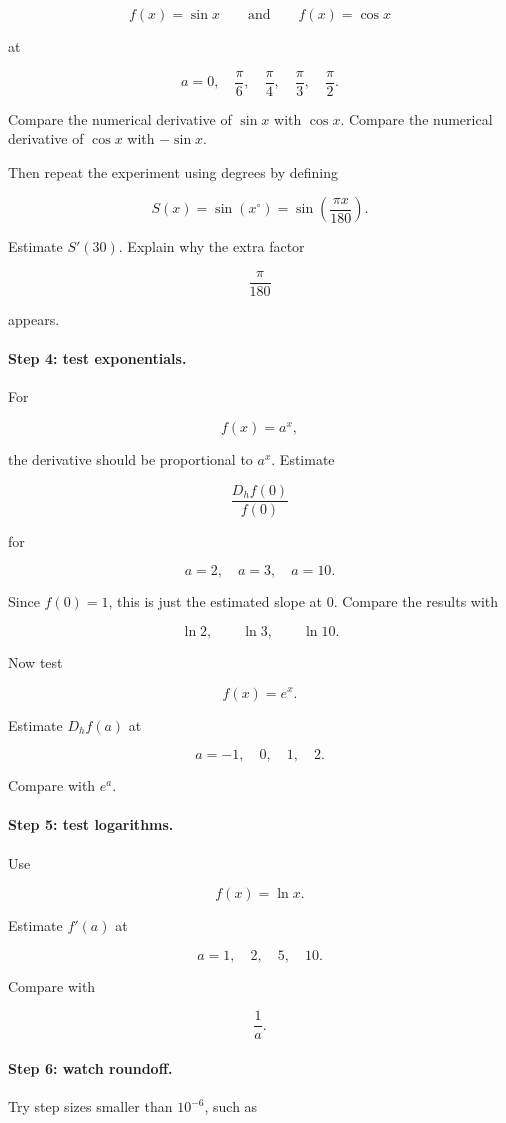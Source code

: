 \[
f(x)=\sin x
\qquad\text{and}\qquad
f(x)=\cos x
\]

at

\[
a=0,\quad \frac{\pi}{6},\quad \frac{\pi}{4},\quad \frac{\pi}{3},\quad \frac{\pi}{2}.
\]

Compare the numerical derivative of \(\sin x\) with \(\cos x\).  Compare the numerical derivative of \(\cos x\) with \(-\sin x\).

Then repeat the experiment using degrees by defining

\[
S(x)=\sin(x^\circ)=\sin\left(\frac{\pi x}{180}\right).
\]

Estimate \(S'(30)\).  Explain why the extra factor

\[
\frac{\pi}{180}
\]

appears.

\paragraph{Step 4: test exponentials.}
For

\[
f(x)=a^x,
\]

the derivative should be proportional to \(a^x\).  Estimate

\[
\frac{D_h f(0)}{f(0)}
\]

for

\[
a=2,\quad a=3,\quad a=10.
\]

Since \(f(0)=1\), this is just the estimated slope at \(0\).  Compare the results with

\[
\ln2,\qquad \ln3,\qquad \ln10.
\]

Now test

\[
f(x)=e^x.
\]

Estimate \(D_h f(a)\) at

\[
a=-1,\quad 0,\quad 1,\quad 2.
\]

Compare with \(e^a\).

\paragraph{Step 5: test logarithms.}
Use

\[
f(x)=\ln x.
\]

Estimate \(f'(a)\) at

\[
a=1,\quad 2,\quad 5,\quad 10.
\]

Compare with

\[
\frac1a.
\]

\paragraph{Step 6: watch roundoff.}
Try step sizes smaller than \(10^{-6}\), such as

